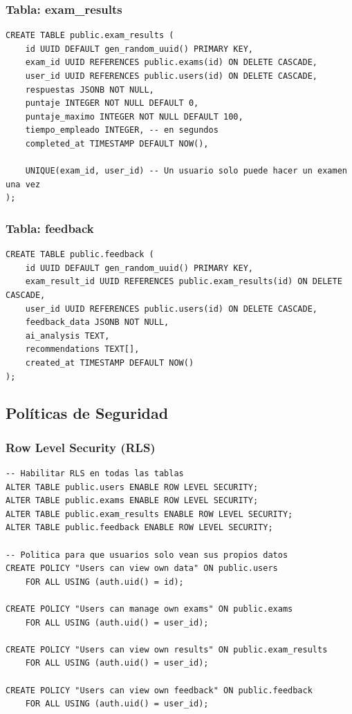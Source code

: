\documentclass[12pt,a4paper]{report}
\begin{document}
\subsubsection{Tabla: exam\_results}
\begin{lstlisting}
CREATE TABLE public.exam_results (
    id UUID DEFAULT gen_random_uuid() PRIMARY KEY,
    exam_id UUID REFERENCES public.exams(id) ON DELETE CASCADE,
    user_id UUID REFERENCES public.users(id) ON DELETE CASCADE,
    respuestas JSONB NOT NULL,
    puntaje INTEGER NOT NULL DEFAULT 0,
    puntaje_maximo INTEGER NOT NULL DEFAULT 100,
    tiempo_empleado INTEGER, -- en segundos
    completed_at TIMESTAMP DEFAULT NOW(),
    
    UNIQUE(exam_id, user_id) -- Un usuario solo puede hacer un examen una vez
);
\end{lstlisting}

\subsubsection{Tabla: feedback}
\begin{lstlisting}
CREATE TABLE public.feedback (
    id UUID DEFAULT gen_random_uuid() PRIMARY KEY,
    exam_result_id UUID REFERENCES public.exam_results(id) ON DELETE CASCADE,
    user_id UUID REFERENCES public.users(id) ON DELETE CASCADE,
    feedback_data JSONB NOT NULL,
    ai_analysis TEXT,
    recommendations TEXT[],
    created_at TIMESTAMP DEFAULT NOW()
);
\end{lstlisting}

\subsection{Políticas de Seguridad}

\subsubsection{Row Level Security (RLS)}
\begin{lstlisting}
-- Habilitar RLS en todas las tablas
ALTER TABLE public.users ENABLE ROW LEVEL SECURITY;
ALTER TABLE public.exams ENABLE ROW LEVEL SECURITY;
ALTER TABLE public.exam_results ENABLE ROW LEVEL SECURITY;
ALTER TABLE public.feedback ENABLE ROW LEVEL SECURITY;

-- Politica para que usuarios solo vean sus propios datos
CREATE POLICY "Users can view own data" ON public.users
    FOR ALL USING (auth.uid() = id);

CREATE POLICY "Users can manage own exams" ON public.exams
    FOR ALL USING (auth.uid() = user_id);

CREATE POLICY "Users can view own results" ON public.exam_results
    FOR ALL USING (auth.uid() = user_id);

CREATE POLICY "Users can view own feedback" ON public.feedback
    FOR ALL USING (auth.uid() = user_id);
\end{lstlisting}
\end{document}
